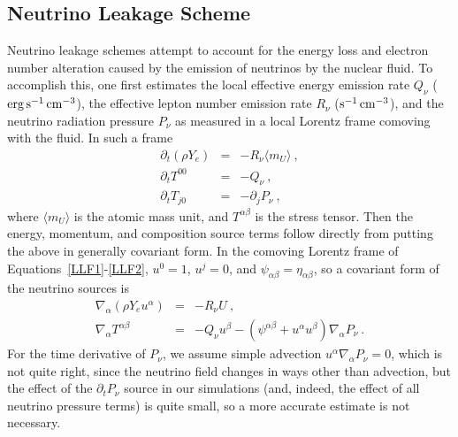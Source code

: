\subsection{Neutrino Leakage Scheme}
\label{sec:leakage}
Neutrino leakage schemes attempt to account for
the energy loss and electron number alteration caused
by the emission of neutrinos by the nuclear fluid.  To accomplish this, one
first estimates the local effective energy emission rate
$Q_{\nu}$ ($\rm erg\,s^{-1}\,cm^{-3}$), the effective lepton number
emission rate $R_{\nu}$ ($\rm s^{-1}\,cm^{-3}$), and the neutrino
radiation pressure $P_{\nu}$ as measured in a local
Lorentz frame comoving with the fluid.  In such a frame
\begin{eqnarray}
\label{LLF1}
\partial_t (\rho Y_e) &=& -R_{\nu}\langle m_U \rangle\ , \\
\partial_t T^{00} &=& -Q_{\nu}\ , \\
\label{LLF2}
\partial_t T_{j0} &=& -\partial_j P_{\nu}\ ,
\end{eqnarray}
where $\langle m_U \rangle$ is the atomic mass unit,
and $T^{\alpha\beta}$ is the stress tensor.
Then the energy,
momentum, and composition source terms
follow directly from putting the above in generally
covariant form.  In the comoving Lorentz frame of
Equations~\ref{LLF1}-\ref{LLF2}, $u^0=1$, $u^j=0$,
and $\psi_{\alpha\beta}=\eta_{\alpha\beta}$,
so a covariant form of the neutrino sources is
\begin{eqnarray}
  \nabla_{\alpha}(\rho Y_e u^{\alpha}) &=& -R_{\nu}U\ , \\
  \nabla_{\alpha}T^{\alpha\beta} &=& -Q_{\nu}u^{\beta}
  - (\psi^{\alpha\beta}+u^{\alpha}u^{\beta})\nabla_{\alpha}P_{\nu}\ .
\end{eqnarray}
For the time derivative of $P_{\nu}$, we assume simple
advection $u^{\alpha}\nabla_{\alpha}P_{\nu}=0$, which is
not quite right, since the neutrino field changes in ways other
than advection, but the effect of the $\partial_tP_{\nu}$
source in our simulations (and, indeed, the effect of all neutrino
pressure terms) is quite small, so a more accurate
estimate is not necessary.

